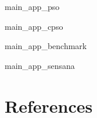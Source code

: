 \documentclass[3p, 10pt, review, times, authoryear]{elsarticle}
\begin{document}
\appendix


{main_app_pso}


{main_app_cpso}


{main_app_benchmark}


{main_app_sensana}


\section*{References}


\end{document}
